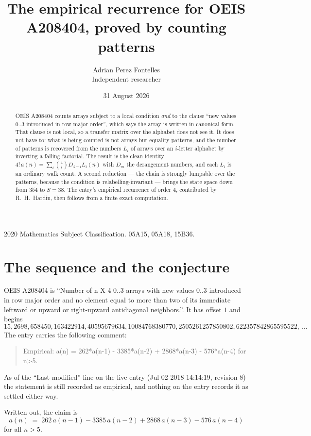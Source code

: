\documentclass[11pt,a4paper]{article}
\title{The empirical recurrence for OEIS A208404, proved by counting patterns}
\author{Adrian Perez Fontelles\\ \small Independent researcher}
\date{31 August 2026}
\theoremstyle{plain}
\theoremstyle{definition}
\begin{document}
\maketitle

\begin{abstract}
OEIS A208404 counts arrays subject to a local condition \emph{and} to the clause ``new values
$0..3$ introduced in row major order'', which says the array is written in canonical
form. That clause is not local, so a transfer matrix over the alphabet does not see it. It
does not have to: what is being counted is not arrays but equality patterns, and the number
of patterns is recovered from the numbers $L_i$ of arrays over an $i$-letter alphabet by
inverting a falling factorial. The result is the clean identity
$4!\,a(n)=\sum_i\binom{4}{i}D_{4-i}L_i(n)$ with $D_m$ the derangement numbers,
and each $L_i$ is an ordinary walk count. A second reduction --- the chain is strongly
lumpable over the patterns, because the condition is relabelling-invariant --- brings the
state space down from $354$ to $S=38$. The entry's empirical recurrence of order
$4$, contributed by R.~H.~Hardin, then follows from a finite exact computation.
\end{abstract}

\noindent\small 2020 Mathematics Subject Classification. 05A15, 05A18, 15B36.\normalsize

\section{The sequence and the conjecture}

OEIS A208404 is ``Number of n X 4 0..3 arrays with new values 0..3 introduced in row major order and no element equal to more than two of its immediate leftward or upward or right-upward antidiagonal neighbors.''. It has offset $1$ and begins
\[
15, 2698, 658450, 163422914, 40595679634, 10084768380770, 2505261257850802, 622357842865595522,\ \dots
\]
The entry carries the following comment:
\begin{quote}\small
Empirical: a(n) = 262*a(n-1) - 3385*a(n-2) + 2868*a(n-3) - 576*a(n-4) for n>5.
\end{quote}
As of the ``Last modified'' line on the live entry (Jul 02 2018 14:14:19, revision 8) the statement is
still recorded as empirical, and nothing on the entry records it as settled either way.

Written out, the claim is
\begin{equation}\label{eq:conj}
a(n)\;=\;262\,a(n-1) - 3385\,a(n-2) + 2868\,a(n-3) - 576\,a(n-4)
\end{equation}
for all $n>5$.
\end{document}
